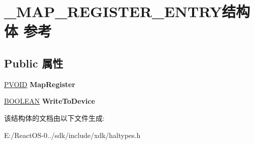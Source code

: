 \hypertarget{struct___m_a_p___r_e_g_i_s_t_e_r___e_n_t_r_y}{}\section{\+\_\+\+M\+A\+P\+\_\+\+R\+E\+G\+I\+S\+T\+E\+R\+\_\+\+E\+N\+T\+R\+Y结构体 参考}
\label{struct___m_a_p___r_e_g_i_s_t_e_r___e_n_t_r_y}
\subsection*{Public 属性}
\begin{DoxyCompactItemize}
\item 
\mbox{\label{struct___m_a_p___r_e_g_i_s_t_e_r___e_n_t_r_y_a2875e0bc3d4cd1359bcf02f0242a4ba1}} 
\hyperlink{interfacevoid}{P\+V\+O\+ID} {\bfseries Map\+Register}
\item 
\mbox{\label{struct___m_a_p___r_e_g_i_s_t_e_r___e_n_t_r_y_a4d039360a7449ae8ce8a65be69c11907}} 
\hyperlink{_processor_bind_8h_a112e3146cb38b6ee95e64d85842e380a}{B\+O\+O\+L\+E\+AN} {\bfseries Write\+To\+Device}
\end{DoxyCompactItemize}


该结构体的文档由以下文件生成\+:\begin{DoxyCompactItemize}
\item 
E\+:/\+React\+O\+S-\/0../sdk/include/xdk/haltypes.\+h\end{DoxyCompactItemize}
